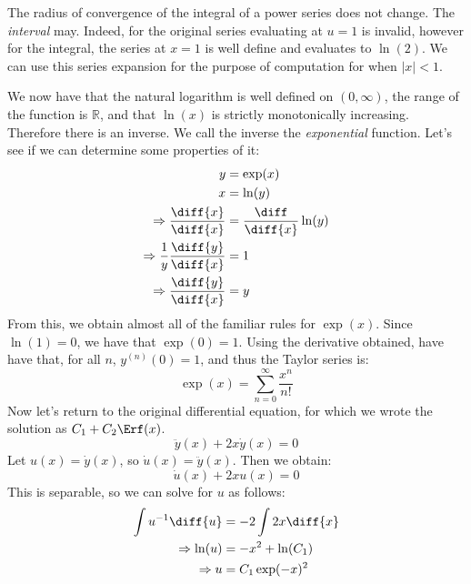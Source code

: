         The radius of convergence of the integral of a power
        series does not change. The \textit{interval} may.
        Indeed, for the original series evaluating at
        $u=1$ is invalid, however for the integral, the series at
        $x=1$ is well define and evaluates to $\ln(2)$. We can
        use this series expansion for the purpose of computation
        for when $|x|<1$.
        \par\hfill\par
        We now have that the natural logarithm is well defined on
        $(0,\infty)$, the range of the function is
        $\mathbb{R}$, and that $\ln(x)$ is strictly monotonically
        increasing. Therefore there is an inverse. We call the
        inverse the \textit{exponential} function. Let's see
        if we can determine some properties of it:
        \begin{align}
            y&=\exp(x)\\
            x&=\ln(y)\\
            \Rightarrow\frac{\diff{x}}{\diff{x}}
            &=\frac{\diff}{\diff{x}}\ln(y)\\
            \Rightarrow\frac{1}{y}\frac{\diff{y}}{\diff{x}}&=1\\
            \Rightarrow\frac{\diff{y}}{\diff{x}}&=y
        \end{align}
        From this, we obtain almost all of the familiar rules for
        $\exp(x)$. Since $\ln(1)=0$, we have that $\exp(0)=1$.
        Using the derivative obtained, have have that, for all
        $n$, $y^{(n)}(0)=1$, and thus the Taylor series is:
        \begin{equation}
            \exp(x)=\sum_{n=0}^{\infty}\frac{x^{n}}{n!}
        \end{equation}
        Now let's return to the original differential equation,
        for which we wrote the solution as $C_{1}+C_{2}\Erf(x)$.
        \begin{equation}
            \ddot{y}(x)+2x\dot{y}(x)=0
        \end{equation}
        Let $u(x)=\dot{y}(x)$, so $\dot{u}(x)=\ddot{y}(x)$.
        Then we obtain:
        \begin{equation}
            \dot{u}(x)+2xu(x)=0
        \end{equation}
        This is separable, so we can solve for $u$ as follows:
        \begin{align}
            \int{u}^{-1}\diff{u}
            &=-2\int{2x}\diff{x}\\
            \Rightarrow\ln(u)&=-x^{2}+\ln(C_{1})\\
            \Rightarrow{u}&=C_{1}\exp(-x)^{2}
        \end{align}
